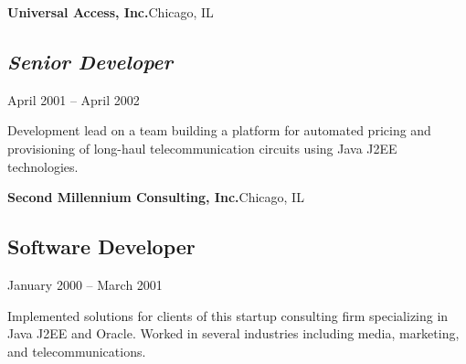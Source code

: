 {\vskip 10pt

{\bf Universal Access, Inc.}\quad Chicago, IL

\subsection{\sl Senior Developer}
    {April 2001 -- April 2002}

Development lead on a team building a platform for automated pricing
and provisioning of long-haul telecommunication circuits using Java
J2EE technologies.

\vskip 10pt

{\bf Second Millennium Consulting, Inc.}\quad Chicago, IL

\subsection{Software Developer}
    {January 2000 -- March 2001}

Implemented solutions for clients of this startup consulting firm
specializing in Java J2EE and Oracle.  Worked in several industries
including media, marketing, and telecommunications.
}
\vfil\eject

